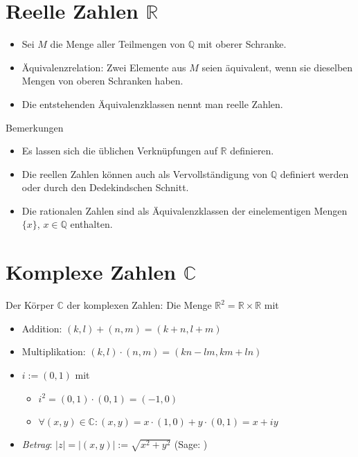 \documentclass[a4paper,12pt,DIV15]{scrartcl}
\begin{document}
\section{Reelle Zahlen $\mathbb{R}$}
\begin{itemize}
\item Sei $M$ die Menge aller Teilmengen von $\mathbb{Q}$ mit oberer
Schranke.
\item Äquivalenzrelation: Zwei Elemente aus $M$ seien äquivalent, wenn sie dieselben
Mengen von oberen Schranken haben. 
\item Die entstehenden Äquivalenzklassen nennt man {\color{red} reelle
Zahlen}.
\end{itemize}
Bemerkungen
\begin{itemize}
\item Es lassen sich die üblichen Verknüpfungen auf $\mathbb{R}$
definieren. 
\item Die reellen Zahlen können auch als Vervollständigung von
$\mathbb{Q}$ definiert werden oder durch den Dedekindschen Schnitt.
\item Die rationalen Zahlen sind als Äquivalenzklassen der
einelementigen Mengen $\{ x \}$, $x \in \mathbb{Q}$ enthalten.

 \end{itemize}






\section{Komplexe Zahlen $\mathbb{C}$}
Der Körper $\mathbb{C}$ der {\color{red} komplexen Zahlen}:
Die Menge $\mathbb{R}^2=\mathbb{R} \times \mathbb{R}$ mit 
\begin{itemize}
 \item   Addition: $(k,l)+(n,m)=(k+n,l+m)$
\item Multiplikation:  $ (k,l) \cdot (n,m) = (kn-lm, km+ln) $
\end{itemize}

\begin{itemize}
 \item {\color{red} $i:=(0,1)$}  mit 
\begin{itemize}
\item $ i^2=(0,1) \cdot (0,1) = (-1,0) $
\item $\forall (x,y) \in \mathbb{C}:  (x,y)=x \cdot (1,0) + y \cdot (0,1)= x +i y$
\end{itemize}
\item \textsl{Betrag}: $|z|=|(x,y)|:=\sqrt{x^2+y^2}$ (Sage: )
\end{itemize}
\end{document}
